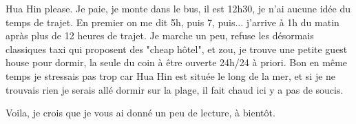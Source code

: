 \begin{multicols}{2}
Hua Hin please. Je paie, je monte dans le bus, il est 12h30, je n'ai aucune idée du temps de trajet. En premier on me dit 5h, puis 7, puis... j'arrive à 1h du matin apràs plus de 12 heures de trajet. Je marche un peu, refuse les désormais classiques taxi qui proposent des "cheap hôtel", et zou, je trouve une petite guest house pour dormir, la seule du coin à être ouverte 24h/24 à priori. Bon en même temps je stressais pas trop car Hua Hin est située le long de la mer, et si je ne trouvais rien je serais allé dormir sur la plage, il fait chaud ici y a pas de soucis.

Voila, je crois que je vous ai donné un peu de lecture, à bientôt.

\end{multicols}


